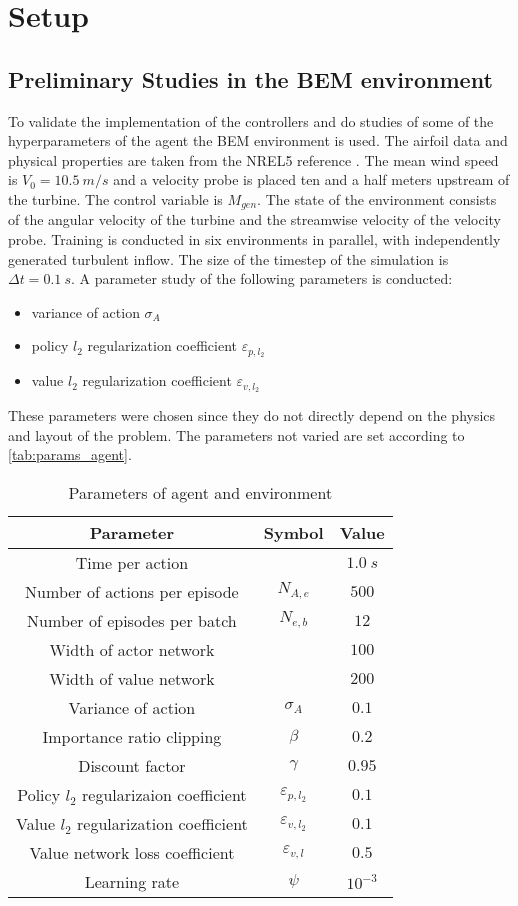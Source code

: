\section{Setup}
\subsection{Preliminary Studies in the BEM environment}
To validate the implementation of the controllers and do studies of some of the hyperparameters of the agent the BEM environment is used. The airfoil data and physical properties are taken from the NREL5 reference \cite{jonkman_definition_2009}. The mean wind speed is $V_0=\SI{10.5}{m/s}$ and a velocity probe is placed ten and a half meters upstream of the turbine.
The control variable is $M_{gen}$. The state of the environment consists of the angular velocity of the turbine and the streamwise velocity of the velocity probe. Training is conducted in six environments in parallel, with independently generated turbulent inflow. The size of the timestep of the simulation is $\Delta t = \SI{0.1}{s}$.
A parameter study of the following parameters is conducted:
\begin{itemize}
	\item variance of action $\sigma_A$
	\item policy $l_2$ regularization coefficient $\varepsilon_{p,l_2}$
	\item value $l_2$ regularization coefficient $\varepsilon_{v,l_2}$
\end{itemize}
These parameters were chosen since they do not directly depend on the physics and layout of the problem. The parameters not varied are set according to \autoref{tab:params_agent}.
\begin{table}[h]
	\centering
	\caption{Parameters of agent and environment}
	\begin{tabular}{|c|c|c|}
		\hline
		Parameter & Symbol & Value \\
		\hline \hline
		Time per action & & $\SI{1.0}{s}$ \\ \hline
		Number of actions per episode & $N_{A,e}$ & $500$ \\ \hline
		Number of episodes per batch & $N_{e,b}$ & $12$ \\ \hline
		Width of actor network & & $100$ \\ \hline
		Width of value network & & $200$ \\ \hline
		Variance of action & $\sigma_A$ & $0.1$ \\ \hline
		Importance ratio clipping & $\beta$ & $0.2$ \\ \hline
		Discount factor & $\gamma$ & $0.95$ \\ \hline
		Policy $l_2$ regularizaion coefficient & $\varepsilon_{p,l_2} $ & $0.1$ \\ \hline
		Value $l_2$ regularization coefficient & $\varepsilon_{v,l_2}$ & $0.1$ \\ \hline
		Value network loss coefficient & $\varepsilon_{v,l}$ & $0.5$ \\ \hline
		Learning rate & $\psi$ & $10^{-3}$ \\
		\hline
	\end{tabular}
	\label{tab:params_agent}
\end{table}

